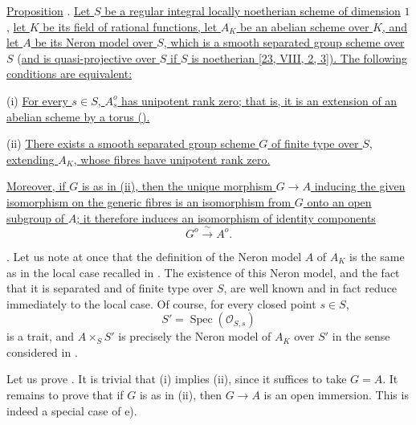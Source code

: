 
\medskip
\noindent
\underline{Proposition} . \underline{Let $S$ be a regular integral
locally noetherian scheme of dimension} $1$, \underline{let $K$ be its field of rational
functions, let $A_K$ be an abelian scheme over $K$, and let $A$ be its Neron
model over $S$, which is a smooth separated group scheme over $S$} (\underline{and is
quasi-projective over $S$ if $S$ is noetherian [23, VIII, 2, 3\textdegree]).
The following conditions are equivalent:}

\smallskip
\noindent
(i) \underline{For every $s\in S$, $A_s^o$ has unipotent rank zero; that is,
it is an extension of an abelian scheme by a torus ().}

\smallskip
\noindent
(ii) \underline{There exists a smooth separated group scheme $G$ of finite
type over $S$, extending $A_K$, whose fibres have unipotent rank zero.}

\smallskip
\noindent
\underline{Moreover, if $G$ is as in (ii), then the unique morphism
$G\longrightarrow A$ inducing the given isomorphism on the generic fibres
is an isomorphism from $G$ onto an open subgroup of $A$; it therefore induces
an isomorphism of identity components}
\[
 G^o\xrightarrow{\ \sim\ }A^o.
\]

\medskip
\noindent
{}.  Let us note at once that the definition of the Neron model $A$ of
$A_K$ is the same as in the local case recalled in .  The existence of
this Neron model, and the fact that it is separated and of finite type over
$S$, are well known and in fact reduce immediately to the local case.  Of
course, for every closed point $s\in S$,
\[
 S'=\operatorname{Spec}(\mathcal O_{S,s})
\]
is a trait, and $A\times_S S'$ is precisely the Neron model of $A_K$ over
$S'$ in the sense considered in .

Let us prove .  It is trivial that (i) implies (ii), since it suffices to
take $G=A$.  It remains to prove that if $G$ is as in (ii), then
$G\longrightarrow A$ is an open immersion.  This is indeed a special case
of  e).

